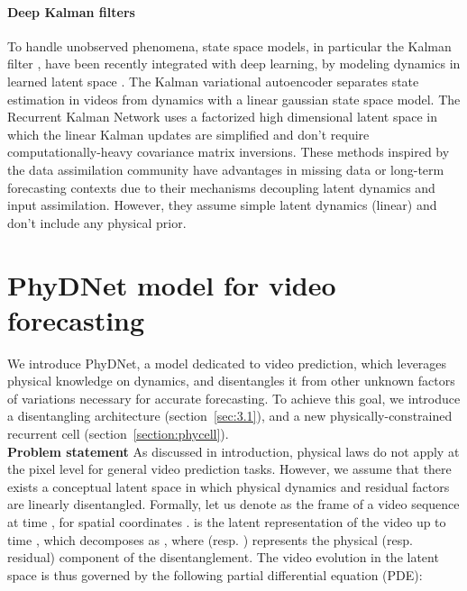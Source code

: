 \documentclass[10pt,twocolumn,letterpaper]{article}
\begin{document}
\paragraph{Deep Kalman filters}
To handle unobserved phenomena, state space models, in particular the Kalman filter \cite{kalman1960new}, have been recently integrated with deep learning, by modeling dynamics in learned latent space \cite{Krishnan2015DeepKF,watter2015embed,haarnoja2016backprop,fraccaro2017disentangled,becker2019recurrent}. The Kalman variational autoencoder \cite{fraccaro2017disentangled} separates state estimation in videos from dynamics with a linear gaussian state space model. The Recurrent Kalman Network \cite{becker2019recurrent} uses a factorized high dimensional latent space in which the linear Kalman updates are simplified and don't require computationally-heavy covariance matrix inversions. These methods inspired by the data assimilation community \cite{asch2016data,bocquet2019data} have advantages in missing data or long-term forecasting contexts due to their mechanisms decoupling latent dynamics and input assimilation. However, they assume simple latent dynamics (linear) and don't include any physical prior. 












\section{PhyDNet model for video forecasting}
\label{section3}



We introduce PhyDNet, a model dedicated to video prediction, which leverages physical knowledge on dynamics, and disentangles it from other unknown factors of variations necessary for accurate forecasting. To achieve this goal, we introduce a disentangling architecture (section~\ref{sec:3.1}), and a new physically-constrained recurrent cell (section~\ref{section:phycell}). \vspace{0.25cm} \\ 
\textbf{Problem statement} As discussed in introduction, physical laws do not apply at the pixel level for general video prediction tasks. However, we  assume that there exists a conceptual latent space  in which physical dynamics and residual factors are linearly disentangled.
Formally, let us denote as   the frame of a video sequence at time , for spatial coordinates .  is the latent representation of the video up to time , which decomposes as , where  (resp. ) represents the physical (resp. residual) component of the disentanglement. The video evolution in the latent space  is thus governed by the following partial differential equation (PDE):
\end{document}
